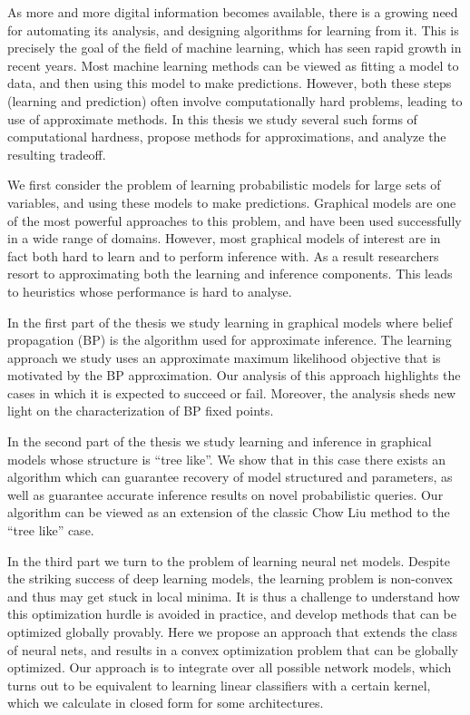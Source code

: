 As more and more digital information becomes available, there is a growing need for automating its analysis, and designing algorithms for learning from it. This is precisely the goal 
of the field of machine learning, which has seen rapid growth in recent years. 
Most machine learning methods can be viewed as fitting a model to data, and then using this model to make predictions. However, both these steps (learning and prediction) often
involve computationally hard problems, leading to use of approximate methods. In this thesis we study several such forms of computational hardness, propose methods
for approximations, and analyze the resulting tradeoff.

We first consider the problem of learning probabilistic models for large sets of variables, and using these models to make predictions. Graphical models are one of the most powerful approaches
to this problem, and have been used successfully in a wide range of domains. However, most graphical models of interest are in fact both hard to learn and to perform inference with. As a result
researchers resort to approximating both the learning and inference components. This leads to heuristics whose performance is hard to analyse.

In the first part of the thesis we study learning in graphical models where belief propagation (BP) is the algorithm used for approximate inference. The learning approach we study uses
an approximate maximum likelihood objective that is motivated by the BP approximation. Our analysis of this approach highlights the cases in which it is expected to succeed or fail. Moreover,
the analysis sheds new light on the characterization of BP fixed points. 

In the second part of the thesis we study learning and inference in graphical models whose structure is ``tree like''. We show that in this case there exists an algorithm which can guarantee recovery of model structured and parameters, as well as guarantee accurate inference results on novel probabilistic queries. Our algorithm can be viewed as an extension of the classic Chow Liu method to the ``tree like'' case. 

In the third part we turn to the problem of learning neural net models. Despite the striking success of deep learning models, the learning problem is non-convex and thus may get stuck in local minima. It is thus a challenge to understand how this optimization hurdle is avoided in practice, and develop methods that can be optimized globally provably. Here we propose an approach that
extends the class of neural nets, and results in a convex optimization problem that can be globally optimized. Our approach is to integrate over all possible network models, which turns out to be equivalent to learning linear classifiers with a certain kernel, which we calculate in closed form for some architectures. 


